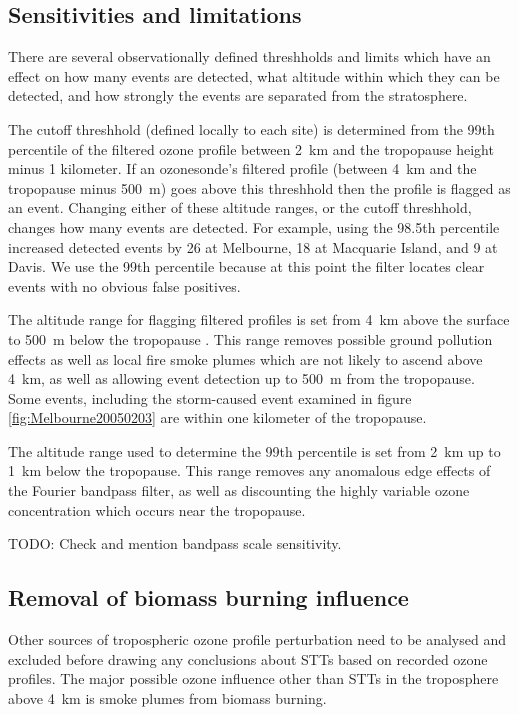 \documentclass{article}
\begin{document}
  \subsection{Sensitivities and limitations}
    There are several observationally defined threshholds and limits which have an effect on how many events are detected, what altitude within which they can be detected, and how strongly the events are separated from the stratosphere.
    
    The cutoff threshhold (defined locally to each site) is determined from the 99th percentile of the filtered ozone profile between 2~km and the tropopause height minus 1 kilometer.
    If an ozonesonde's filtered profile (between 4~km and the tropopause minus 500~m) goes above this threshhold then the profile is flagged as an event.
    Changing either of these altitude ranges, or the cutoff threshhold, changes how many events are detected.
    For example, using the 98.5th percentile increased detected events by 26 at Melbourne, 18 at Macquarie Island, and 9 at Davis.
    We use the 99th percentile because at this point the filter locates clear events with no obvious false positives.
    
    The altitude range for flagging filtered profiles is set from 4~km above the surface to 500~m below the tropopause .
    This range removes possible ground pollution effects as well as local fire smoke plumes which are not likely to ascend above 4~km, as well as allowing event detection up to 500~m from the tropopause.
    Some events, including the storm-caused event examined in figure \ref{fig:Melbourne20050203} are within one kilometer of the tropopause. 
    
    The altitude range used to determine the 99th percentile is set from 2~km up to 1~km below the tropopause.
    This range removes any anomalous edge effects of the Fourier bandpass filter, as well as discounting the highly variable ozone concentration which occurs near the tropopause.
    
    TODO: Check and mention bandpass scale sensitivity.
    
  \subsection{Removal of biomass burning influence}
    
    Other sources of tropospheric ozone profile perturbation need to be analysed and excluded before drawing any conclusions about STTs based on recorded ozone profiles. 
    The major possible ozone influence other than STTs in the troposphere above 4~km is smoke plumes from biomass burning.
    
\end{document}
